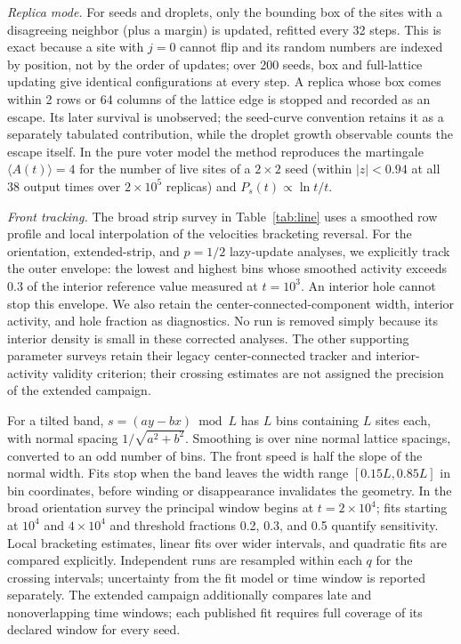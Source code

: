 \documentclass[pre,twocolumn,superscriptaddress,showpacs,floatfix]{revtex4-2}
\begin{document}
\textit{Replica mode.} For seeds and droplets, only the bounding box of the sites with a
disagreeing neighbor (plus a margin) is updated, refitted every 32 steps. This is exact because a
site with $j = 0$ cannot flip and its random numbers are indexed by position, not by the order
of updates; over 200 seeds, box and full-lattice updating give identical configurations at
every step. A replica whose box comes within 2 rows or 64 columns of the lattice edge is stopped
and recorded as an escape. Its later survival is unobserved; the
seed-curve convention retains it as a separately tabulated contribution,
while the droplet growth observable counts the escape itself. In the pure voter model the method reproduces the martingale
$\langle A(t)\rangle = 4$ for the number of live sites of a $2\times2$ seed (within $|z|<0.94$
at all 38 output times over $2\times10^5$ replicas) and $P_s(t)\propto\ln t/t$.

\textit{Front tracking.} The broad strip survey in Table~\ref{tab:line}
uses a smoothed row profile and local interpolation of the velocities bracketing
reversal. For the orientation, extended-strip, and $p=1/2$ lazy-update
analyses, we explicitly track
the outer envelope: the lowest and highest bins whose smoothed activity exceeds
$0.3$ of the interior reference value measured at $t=10^3$. An interior hole
cannot stop this envelope. We also retain the center-connected-component width,
interior activity, and hole fraction as diagnostics. No run is removed simply
because its interior density is small in these corrected analyses.
The other supporting parameter surveys retain their legacy center-connected
tracker and interior-activity validity criterion; their crossing estimates
are not assigned the precision of the extended campaign.

For a tilted band, $s=(ay-bx)\bmod L$ has $L$ bins containing $L$ sites each,
with normal spacing $1/\sqrt{a^2+b^2}$. Smoothing is over nine normal lattice
spacings, converted to an odd number of bins. The front speed is half the slope
of the normal width. Fits stop when the band leaves the width range
$[0.15L,0.85L]$ in bin coordinates, before winding or disappearance invalidates
the geometry. In the broad orientation survey the principal window begins at
$t=2\times10^4$; fits starting at $10^4$ and $4\times10^4$ and threshold
fractions 0.2, 0.3, and 0.5 quantify sensitivity. Local bracketing estimates,
linear fits over wider intervals, and quadratic fits are compared explicitly.
Independent runs are resampled within each $q$ for the crossing intervals;
uncertainty from the fit model or time window is reported separately. The
extended campaign additionally compares late and nonoverlapping time windows;
each published fit requires full coverage of its declared window for every seed.
\end{document}
